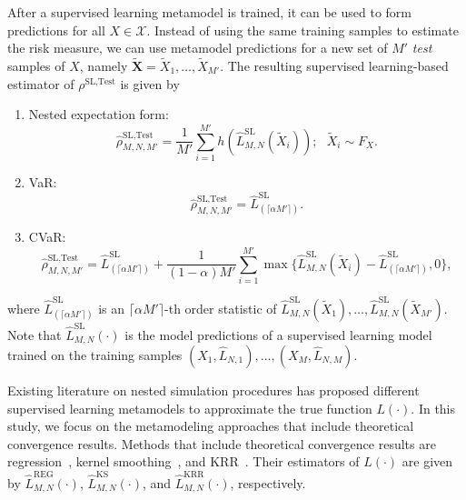 After a supervised learning metamodel is trained, it can be used to form predictions for all $X \in \mathcal{X}$.
Instead of using the same training samples to estimate the risk measure, we can use metamodel predictions for a new set of $M'$ \textit{test} samples of $X$, namely $\tilde{\mathbf{X}} = \tilde{X}_1, \dots, \tilde{X}_{M'}$.
The resulting supervised learning-based estimator of $\rho^{\text{SL}, \text{Test}}$ is given by

\begin{enumerate}
    \item   Nested expectation form:
            \begin{equation} \label{eq1:sl-test}
            \hat{\rho}^{\text{SL}, \text{Test}}_{M, N, M'} = \frac{1}{M'} \sum_{i=1}^{M'} h(\hat{L}^{\text{SL}}_{M, N}(\tilde{X}_i)); ~~~ \tilde{X}_i \sim F_X.
            \end{equation}
    \item   VaR:
            $$\hat{\rho}^{\text{SL}, \text{Test}}_{M, N, M'} = \hat{L}^{\text{SL}}_{(\lceil \alpha M' \rceil)}.$$
    \item   CVaR:
            \begin{equation*}
                \hat{\rho}^{\text{SL}, \text{Test}}_{M, N, M'} 
                = \hat{L}^{\text{SL}}_{(\lceil \alpha M' \rceil)} 
                + \frac{1}{(1-\alpha) M'} \sum_{i=1}^{M'} \max \{\hat{L}^{\text{SL}}_{M, N}(\tilde{X}_i) - \hat{L}^{\text{SL}}_{(\lceil \alpha M' \rceil)}, 0 \}, 
            \end{equation*}
\end{enumerate}
where $\hat{L}^{\text{SL}}_{(\lceil \alpha M' \rceil)}$ is an $\lceil \alpha M' \rceil$-th order statistic of $\hat{L}^{\text{SL}}_{M, N}(\tilde{X}_1), \dots, \hat{L}^{\text{SL}}_{M, N}(\tilde{X}_{M'})$. 
Note that $\hat{L}^{\text{SL}}_{M, N}(\cdot)$ is the model predictions of a supervised learning model trained on the training samples $(X_1, \hat{L}_{N, 1}), \dots, (X_M, \hat{L}_{N, M})$.

Existing literature on nested simulation procedures has proposed different supervised learning metamodels to approximate the true function $L(\cdot)$.
In this study, we focus on the metamodeling approaches that include theoretical convergence results.
Methods that include theoretical convergence results are regression~\citep{broadie2015risk}, kernel smoothing~\citep{hong2017kernel}, and KRR~\citep{wang2022smooth}.
Their estimators of $L(\cdot)$ are given by $\hat{L}^{\text{REG}}_{M, N}(\cdot)$, $\hat{L}^{\text{KS}}_{M, N}(\cdot)$, and $\hat{L}^{\text{KRR}}_{M, N}(\cdot)$, respectively.

